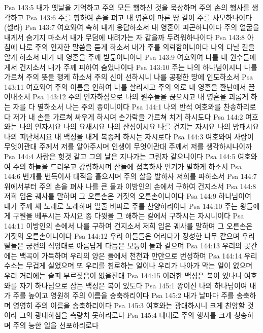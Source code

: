 Psa 143:5  내가 옛날을 기억하고 주의 모든 행하신 것을 묵상하며 주의 손의 행사를 생각하고
Psa 143:6  주를 향하여 손을 펴고 내 영혼이 마른 땅 같이 주를 사모하나이다(셀라)
Psa 143:7  여호와여 속히 내게 응답하소서 내 영혼이 피곤하니이다 주의 얼굴을 내게서 숨기지 마소서 내가 무덤에 내려가는 자 같을까 두려워하나이다
Psa 143:8  아침에 나로 주의 인자한 말씀을 듣게 하소서 내가 주를 의뢰함이니이다 나의 다닐 길을 알게 하소서 내가 내 영혼을 주께 받듦이니이다
Psa 143:9  여호와여 나를 내 원수들에게서 건지소서 내가 주께 피하여 숨었나이다
Psa 143:10  주는 나의 하나님이시니 나를 가르쳐 주의 뜻을 행케 하소서 주의 신이 선하시니 나를 공평한 땅에 인도하소서
Psa 143:11  여호와여 주의 이름을 인하여 나를 살리시고 주의 의로 내 영혼을 환난에서 끌어내소서
Psa 143:12  주의 인자하심으로 나의 원수들을 끊으시고 내 영혼을 괴롭게 하는 자를 다 멸하소서 나는 주의 종이니이다
Psa 144:1  나의 반석 여호와를 찬송하리로다 저가 내 손을 가르쳐 싸우게 하시며 손가락을 가르쳐 치게 하시도다
Psa 144:2  여호와는 나의 인자시요 나의 요새시요 나의 산성이시요 나를 건지는 자시요 나의 방패시요 나의 피난처시요 내 백성을 내게 복종케 하시는 자시로다
Psa 144:3  여호와여 사람이 무엇이관대 주께서 저를 알아주시며 인생이 무엇이관대 주께서 저를 생각하시나이까
Psa 144:4  사람은 헛것 같고 그의 날은 지나가는 그림자 같으니이다
Psa 144:5  여호와여 주의 하늘을 드리우고 강림하시며 산들에 접촉하사 연기가 발하게 하소서
Psa 144:6  번개를 번득이사 대적을 흩으시며 주의 살을 발하사 저희를 파하소서
Psa 144:7  위에서부터 주의 손을 펴사 나를 큰 물과 이방인의 손에서 구하여 건지소서
Psa 144:8  저희 입은 궤사를 말하며 그 오른손은 거짓의 오른손이니이다
Psa 144:9  하나님이여 내가 주께 새 노래로 노래하며 열줄 비파로 주를 찬양하리이다
Psa 144:10  주는 왕들에게 구원을 베푸시는 자시요 종 다윗을 그 해하는 칼에서 구하시는 자시니이다
Psa 144:11  이방인의 손에서 나를 구하여 건지소서 저희 입은 궤사를 말하며 그 오른손은 거짓의 오른손이니이다
Psa 144:12  우리 아들들은 어리다가 장성한 나무 같으며 우리 딸들은 궁전의 식양대로 아름답게 다듬은 모퉁이 돌과 같으며
Psa 144:13  우리의 곳간에는 백곡이 가득하며 우리의 양은 들에서 천천과 만만으로 번성하며
Psa 144:14  우리 수소는 무겁게 실었으며 또 우리를 침로하는 일이나 우리가 나아가 막는 일이 없으며 우리 거리에는 슬피 부르짖음이 없을진대
Psa 144:15  이러한 백성은 복이 있나니 여호와를 자기 하나님으로 삼는 백성은 복이 있도다
Psa 145:1  왕이신 나의 하나님이여 내가 주를 높이고 영원히 주의 이름을 송축하리이다
Psa 145:2  내가 날마다 주를 송축하며 영영히 주의 이름을 송축하리이다
Psa 145:3  여호와는 광대하시니 크게 찬양할 것이라 그의 광대하심을 측량치 못하리로다
Psa 145:4  대대로 주의 행사를 크게 칭송하며 주의 능한 일을 선포하리로다
